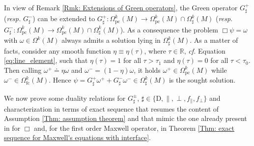 \begin{remark}\label{Rmk: Cauchy problem with non-compact source}
	In view of Remark \ref{Rmk: Extensions of Green operators}, the Green operator $G_\sharp^+$ (\textit{resp.} $G_\sharp^-$) can be extended to  $G_\sharp^+\colon\Omega_{\mathrm{pc}}^k(M)\to\Omega_{\mathrm{pc}}^k(M)\cap\Omega^k_\sharp(M)$ (\textit{resp.} $G_\sharp^-\colon\Omega_{\mathrm{pc}}^k(M)\to\Omega_{\mathrm{pc}}^k(M)\cap\Omega^k_\sharp(M)$).
	As a consequence the problem $\Box\psi=\omega$ with $\omega\in\Omega^k(M)$ always admits a solution lying in $\Omega^k_\sharp(M)$.
	As a matter of facts, consider any smooth function $\eta\equiv\eta(\tau)$, where $\tau\in\mathbb{R}$, {\it cf.} Equation \eqref{eq:line_element}, such that $\eta(\tau)=1$ for all $\tau>\tau_1$ and $\eta(\tau)=0$ for all $\tau<\tau_0$. Then calling $\omega^+\doteq\eta\omega$ and $\omega^-=(1-\eta)\omega$, it holds $\omega^+\in\Omega_{\mathrm{pc}}^k(M)$ while $\omega^-\in\Omega_{\mathrm{fc}}^k(M)$. Hence  $\psi=G_\sharp^+\omega^++G_\sharp^-\omega^-\in\Omega_\sharp^k(M)$ is the sought solution.
\end{remark}

We now prove some duality relations for $G^\pm_\sharp$, $\sharp\in\lbrace\mathrm{D},\parallel,\perp,f_\parallel,f_\perp\rbrace$ and characterization in terms of exact sequence that resumes the content of Assumption \ref{Thm: assumption theorem} and that mimic the one already present in \cite[Prop. 36]{Dappiaggi-Drago-Ferreira-19} for $\Box$ and, for the first order Maxwell operator, in Theorem \ref{Thm: exact sequence for Maxwell's equations with interface}.

